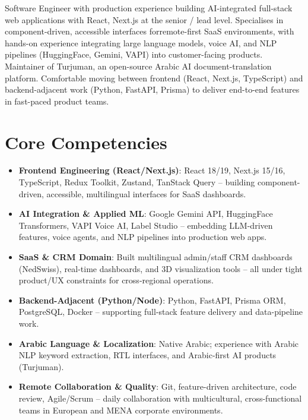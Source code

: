\documentclass[11pt,a4paper,sans]{moderncv}
\begin{document}
\makecvtitle

\vspace{6pt}
\small{Software Engineer with production experience building AI-integrated full-stack web applications with React, Next.js at the senior / lead level. Specialises in component-driven, accessible interfaces forremote-first SaaS environments, with hands-on experience integrating large language models, voice AI, and NLP pipelines (HuggingFace, Gemini, VAPI) into customer-facing products. Maintainer of Turjuman, an open-source Arabic AI document-translation platform. Comfortable moving between frontend (React, Next.js, TypeScript) and backend-adjacent work (Python, FastAPI, Prisma) to deliver end-to-end features in fast-paced product teams.}

\section{Core Competencies}
\vspace{1pt}
\begin{itemize}

\item \textbf{Frontend Engineering (React/Next.js)}: React 18/19, Next.js 15/16, TypeScript, Redux Toolkit, Zustand, TanStack Query -- building component-driven, accessible, multilingual interfaces for SaaS dashboards.

\item \textbf{AI Integration \& Applied ML}: Google Gemini API, HuggingFace Transformers, VAPI Voice AI, Label Studio -- embedding LLM-driven features, voice agents, and NLP pipelines into production web apps.

\item \textbf{SaaS \& CRM Domain}: Built multilingual admin/staff CRM dashboards (NedSwiss), real-time dashboards, and 3D visualization tools -- all under tight product/UX constraints for cross-regional operations.

\item \textbf{Backend-Adjacent (Python/Node)}: Python, FastAPI, Prisma ORM, PostgreSQL, Docker -- supporting full-stack feature delivery and data-pipeline work.

\item \textbf{Arabic Language \& Localization}: Native Arabic; experience with Arabic NLP keyword extraction, RTL interfaces, and Arabic-first AI products (Turjuman).

\item \textbf{Remote Collaboration \& Quality}: Git, feature-driven architecture, code review, Agile/Scrum -- daily collaboration with multicultural, cross-functional teams in European and MENA corporate environments.

\end{itemize}
\end{document}
